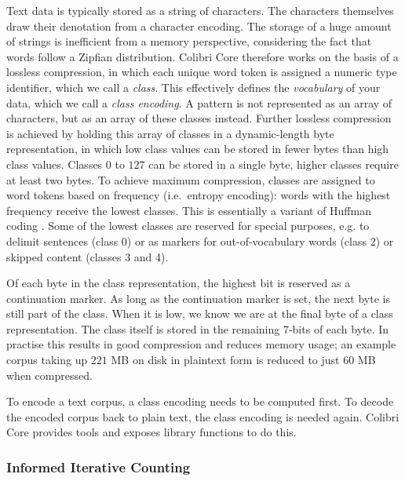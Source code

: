 \documentclass[a4paper,12pt]{article}
\begin{document}
Text data is typically stored as a string of characters. The characters
themselves draw their denotation from a character encoding. The storage of a
huge amount of strings is inefficient from a memory perspective, considering
the fact that words follow a Zipfian distribution. Colibri Core therefore works
on the basis of a lossless compression, in which each unique word token is
assigned a numeric type identifier, which we call a \emph{class}. This
effectively defines the \emph{vocabulary} of your data, which we call a
\emph{class encoding}. A pattern is not represented as an array of
characters, but as an array of these classes instead. Further lossless
compression is achieved by holding this array of classes in a dynamic-length
byte representation, in which low class values can be stored in fewer bytes
than high class values. Classes $0$ to $127$ can be stored in a single byte,
higher classes require at least two bytes. To achieve maximum compression,
classes are assigned to word tokens based on frequency (i.e.\ entropy
encoding): words with the highest frequency receive the lowest classes.  This
is essentially a variant of Huffman coding \citep{HUFFMAN}. Some of the lowest
classes are reserved for special purposes, e.g. to delimit sentences (class 0) or as
markers for out-of-vocabulary words (class 2) or skipped content (classes 3 and 4).

Of each byte in the class representation, the highest bit is reserved as a continuation
marker. As long as the continuation marker is set, the next byte is still part of
the class. When it is low, we know we are at the final byte of a class
representation. The class itself is stored in the remaining 7-bits of each
byte. In practise this results in good compression and reduces memory usage; an
example corpus taking up $221$ MB on disk in plaintext form is reduced to just $60$ MB
when compressed.

To encode a text corpus, a class encoding needs to be computed first. To decode
the encoded corpus back to plain text, the class encoding is needed again.
Colibri Core provides tools and exposes library functions to do this.

\subsubsection{Informed Iterative Counting}
\end{document}
